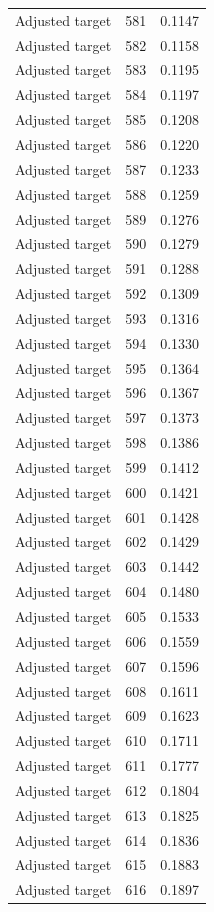 \begin{table}[htbp]
\begin{tabular}{lll}
Adjusted target & 581 & 0.1147 \\
Adjusted target & 582 & 0.1158 \\
Adjusted target & 583 & 0.1195 \\
Adjusted target & 584 & 0.1197 \\
Adjusted target & 585 & 0.1208 \\
Adjusted target & 586 & 0.1220 \\
Adjusted target & 587 & 0.1233 \\
Adjusted target & 588 & 0.1259 \\
Adjusted target & 589 & 0.1276 \\
Adjusted target & 590 & 0.1279 \\
Adjusted target & 591 & 0.1288 \\
Adjusted target & 592 & 0.1309 \\
Adjusted target & 593 & 0.1316 \\
Adjusted target & 594 & 0.1330 \\
Adjusted target & 595 & 0.1364 \\
Adjusted target & 596 & 0.1367 \\
Adjusted target & 597 & 0.1373 \\
Adjusted target & 598 & 0.1386 \\
Adjusted target & 599 & 0.1412 \\
Adjusted target & 600 & 0.1421 \\
Adjusted target & 601 & 0.1428 \\
Adjusted target & 602 & 0.1429 \\
Adjusted target & 603 & 0.1442 \\
Adjusted target & 604 & 0.1480 \\
Adjusted target & 605 & 0.1533 \\
Adjusted target & 606 & 0.1559 \\
Adjusted target & 607 & 0.1596 \\
Adjusted target & 608 & 0.1611 \\
Adjusted target & 609 & 0.1623 \\
Adjusted target & 610 & 0.1711 \\
Adjusted target & 611 & 0.1777 \\
Adjusted target & 612 & 0.1804 \\
Adjusted target & 613 & 0.1825 \\
Adjusted target & 614 & 0.1836 \\
Adjusted target & 615 & 0.1883 \\
Adjusted target & 616 & 0.1897 \\

\end{tabular}
\end{table}
